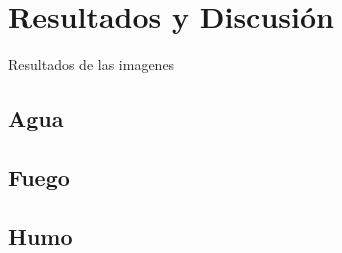 \chapter{Resultados y Discusión}


Resultados de las imagenes
\section{Agua}
\section{Fuego}
\section{Humo}
